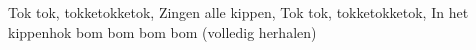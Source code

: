 \beginverse*
Tok tok, tokketokketok,
Zingen alle kippen,
Tok tok, tokketokketok,
In het kippenhok bom bom bom bom (volledig herhalen)
\endverse
\endsong 